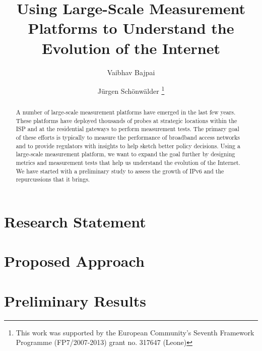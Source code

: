\documentclass[a4paper]{llncs}
\begin{document}
\mainmatter  %

\title{Using Large-Scale Measurement Platforms to Understand the Evolution of
the Internet}

\author{Vaibhav Bajpai \and Jürgen Schönwälder%
\thanks{This work was supported by the European Community’s Seventh Framework
Programme (FP7/2007-2013) grant no. 317647 (Leone)}}
\maketitle

\begin{abstract}

A number of large-scale measurement platforms have emerged in the last few
years. These platforms have deployed thousands of probes at strategic
locations within the \ac{ISP} and at the residential gateways to perform
measurement tests. The primary goal of these efforts is typically to measure
the performance of broadband access networks and to provide regulators with
insights to help sketch better policy decisions. Using a large-scale
measurement platform, we want to expand the goal further by designing metrics
and measurement tests that help us understand the evolution of the Internet.
We have started with a preliminary study to assess the growth of IPv6 and the
repurcussions that it brings.

\end{abstract}


\section{Research Statement}
\label{sec:rstatement}
\section{Proposed Approach}
\label{sec:approach}
\section{Preliminary Results}
\label{sec:preliminaryresults}





\end{document}
